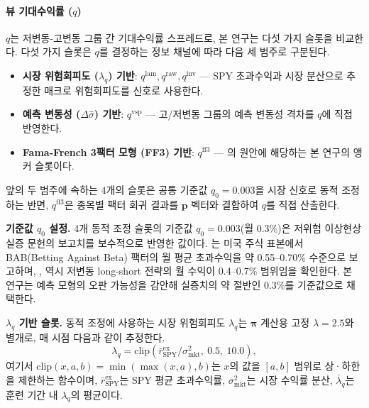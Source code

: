 \documentclass{article}
\begin{document}
\paragraph{뷰 기대수익률 ($q$)}

$q$는 저변동-고변동 그룹 간 기대수익률 스프레드로, 본 연구는 다섯 가지 슬롯을 비교한다. 다섯 가지 슬롯은 $q$를 결정하는 정보 채널에 따라 다음 세 범주로 구분된다.

\begin{itemize}
  \item \textbf{시장 위험회피도 ($\lambda_q$) 기반}: $q^{\mathrm{lam}}, q^{\mathrm{raw}}, q^{\mathrm{inv}}$ --- SPY 초과수익과 시장 분산으로 추정한 매크로 위험회피도를 신호로 사용한다.
  \item \textbf{예측 변동성 ($\Delta\hat{\sigma}$) 기반}: $q^{\mathrm{vsp}}$ --- 고/저변동 그룹의 예측 변동성 격차를 $q$에 직접 반영한다.
  \item \textbf{Fama-French 3팩터 모형 (FF3) 기반}: $q^{\mathrm{ff3}}$ --- \citet{pyo2018}의 원안에 해당하는 본 연구의 앵커 슬롯이다.
\end{itemize}

앞의 두 범주에 속하는 4개의 슬롯은 공통 기준값 $q_0 = 0.003$을 시장 신호로 동적 조정하는 반면, $q^{\mathrm{ff3}}$은 종목별 팩터 회귀 결과를 $\mathbf{p}$ 벡터와 결합하여 $q$를 직접 산출한다.

\textbf{기준값 $q_0$ 설정.} 4개 동적 조정 슬롯의 기준값 $q_0 = 0.003$(월 0.3\%)은 저위험 이상현상 실증 문헌의 보고치를 보수적으로 반영한 값이다. \citet{frazzini2014}는 미국 주식 표본에서 BAB(Betting Against Beta) 팩터의 월 평균 초과수익을 약 0.55--0.70\% 수준으로 보고하며, \citet{baker2011}, \citet{blitz2007} 역시 저변동 long-short 전략의 월 수익이 0.4--0.7\% 범위임을 확인한다. 본 연구는 예측 모형의 오판 가능성을 감안해 실증치의 약 절반인 0.3\%를 기준값으로 채택한다.

\textbf{$\lambda_q$ 기반 슬롯.} 동적 조정에 사용하는 시장 위험회피도 $\lambda_q$는 $\boldsymbol{\pi}$ 계산용 고정 $\lambda = 2.5$와 별개로, 매 시점 다음과 같이 추정한다.
\begin{equation}
  \lambda_q = \mathrm{clip}\!\left(\bar{r}^{\mathrm{ex}}_{\mathrm{SPY}}/\sigma^2_{\mathrm{mkt}},\ 0.5,\ 10.0\right),
\end{equation}
여기서 $\mathrm{clip}(x, a, b) = \min(\max(x, a), b)$는 $x$의 값을 $[a, b]$ 범위로 상·하한을 제한하는 함수이며, $\bar{r}^{\mathrm{ex}}_{\mathrm{SPY}}$는 SPY 평균 초과수익률, $\sigma^2_{\mathrm{mkt}}$는 시장 수익률 분산, $\bar{\lambda}_q$는 훈련 기간 내 $\lambda_q$의 평균이다.
\end{document}
